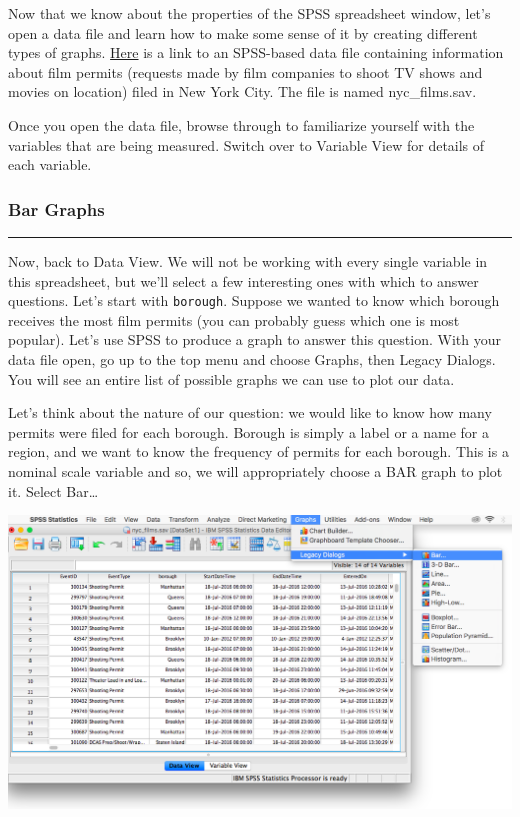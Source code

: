 \documentclass[
]{book}
\begin{document}
Now that we know about the properties of the SPSS spreadsheet window, let's open a data file and learn how to make some sense of it by creating different types of graphs. \href{https://github.com/CrumpLab/statisticsLab/blob/master/data/spssdata/nyc_films.sav}{Here} is a link to an SPSS-based data file containing information about film permits (requests made by film companies to shoot TV shows and movies on location) filed in New York City. The file is named nyc\_films.sav.

Once you open the data file, browse through to familiarize yourself with the variables that are being measured. Switch over to Variable View for details of each variable.

\hypertarget{bar-graphs}{%
\subsubsection{Bar Graphs}\label{bar-graphs}}

\begin{center}\rule{0.5\linewidth}{0.5pt}\end{center}

Now, back to Data View. We will not be working with every single variable in this spreadsheet, but we'll select a few interesting ones with which to answer questions. Let's start with \texttt{borough}. Suppose we wanted to know which borough receives the most film permits (you can probably guess which one is most popular). Let's use SPSS to produce a graph to answer this question. With your data file open, go up to the top menu and choose {Graphs}, then {Legacy Dialogs}. You will see an entire list of possible graphs we can use to plot our data.

Let's think about the nature of our question: we would like to know how many permits were filed for each borough. Borough is simply a label or a name for a region, and we want to know the frequency of permits for each borough. This is a nominal scale variable and so, we will appropriately choose a BAR graph to plot it. Select {Bar\ldots{}}

\includegraphics{img/1.4.14.png}
\end{document}

